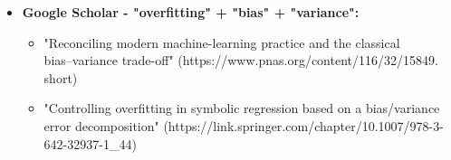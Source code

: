 \documentclass{article}
\begin{document}
\begin{itemize}
\begin{itemize}
            \end{itemize}
        \item \textbf{Google Scholar - "overfitting" + "bias" + "variance":}
            \begin{itemize}
                \item "Reconciling modern machine-learning practice and the classical\\ bias–variance trade-off"
                (https://www.pnas.org/content/116/32/15849.\\short)
                \item "Controlling overfitting in symbolic regression based on a bias/variance error decomposition"
                (https://link.springer.com/chapter/10.1007/978-3-642-32937-1\_44) 
            \end{itemize}
    \end{itemize}
\end{document}
